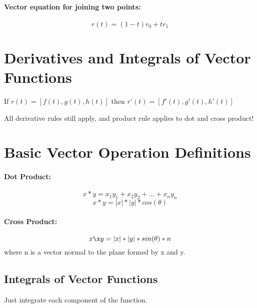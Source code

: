 \documentclass[a4paper,12pt]{report}
\begin{document}
\paragraph{Vector equation for joining two points: } $$r(t) = (1-t)r_0 + tr_1$$

\section{Derivatives and Integrals of Vector Functions}
If $r(t) = [f(t), g(t), h(t)]$ then $r'(t) = [f'(t), g'(t), h'(t)]$

All derivative rules still apply, and product rule applies to dot and cross product!

\section{Basic Vector Operation Definitions}
\paragraph{Dot Product: } $$x * y = x_1y_1+x_2y_2+ ... + x_ny_n$$
$$x * y = |x|*|y|*cos(\theta)$$
\paragraph{Cross Product: } $$x \x y = |x|*|y|*sin(\theta) * n$$ where n is a vector normal to the plane formed by x and y.

\subsection{Integrals of Vector Functions}
Just integrate each component of the function.
\end{document}

